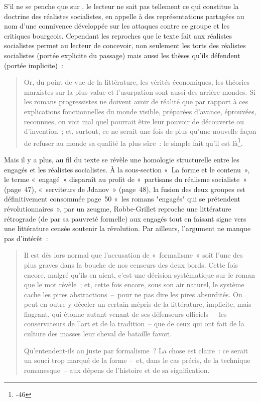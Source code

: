 S'il ne se penche que sur \punr{}, le lecteur ne sait pas tellement ce qui constitue la doctrine des réalistes socialistes, \robbe{} en appelle à des représentations partagées au nom d'une connivence développée sur les attaques contre ce groupe et les critiques bourgeois. Cependant les reproches que le texte fait aux réalistes socialistes permet au lecteur de concevoir, non seulement les torts des réalistes socialistes (portée explicite du passage) mais aussi les thèses qu'ils défendent (portée implicite)~:
\begin{quote}
Or, du point de vue de la littérature, les vérités économiques, les théories marxistes sur la plus-value et l’usurpation sont aussi des arrière-mondes. Si les romans progressistes ne doivent avoir de réalité que par rapport à ces explications fonctionnelles du monde visible, préparées d’avance, éprouvées, reconnues, on voit mal quel pourrait être leur pouvoir de découverte ou d’invention~; et, surtout, ce ne serait une fois de plus qu’une nouvelle façon de refuser au monde sa qualité la plus sûre~: le simple fait qu’il est là\footnote{-46}.
\end{quote}
Mais il y a plus, au fil du texte se révèle une homologie structurelle entre les engagés et les réalistes socialistes. À la sous-section %
«~La forme et le contenu~», le terme «~engagé~» disparaît au profit de «~partisans du réalisme socialiste~» (page~47), «~serviteurs de Jdanov~» (page~48), la fusion des deux groupes est définitivement consommée page~50 «~les romans "engagés" qui se prétendent révolutionnaires~», par un zeugme, Robbe-Grillet reproche une littérature rétrograde (de par sa pauvreté formelle) aux engagés tout en faisant signe vers une littérature censée soutenir la révolution. Par ailleurs, l'argument ne manque pas d'intérêt~: 
\begin{quote}
    Il est dès lors normal que l’accusation de «~formalisme~» soit l’une des plus graves dans la bouche de nos censeurs des deux bords. Cette fois encore, malgré qu’ils en aient, c’est une décision systématique sur le roman que le mot révèle~; et, cette fois encore, sous son air naturel, le système cache les pires abstractions~–~pour ne pas dire les pires absurdités. On peut en outre y déceler un certain mépris de la littérature, implicite, mais flagrant, qui étonne autant venant de ses défenseurs officiels~–~les conservateurs de l’art et de la tradition~– que de ceux qui ont fait de la culture des masses leur cheval de bataille favori.

    Qu’entendent-ils au juste par formalisme~? La chose est claire~: ce serait un souci trop marqué de la forme –~et, dans le cas précis, de la technique romanesque~– aux dépens de l’histoire et de sa signification.
\end{quote}
